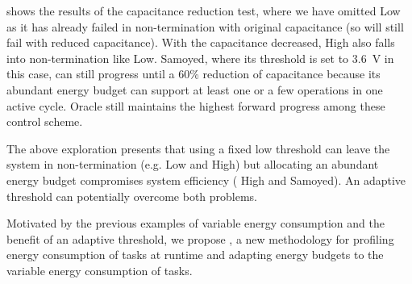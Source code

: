

 shows the results of the capacitance reduction test, where we have omitted \debs{} Low as it has already failed in non-termination with original capacitance (so will still fail with reduced capacitance). 
With the capacitance decreased, \debs{} High also falls into non-termination like \debs{} Low. 
Samoyed, where its threshold is set to \SI{3.6}{\volt} in this case, can still progress until a 60\% reduction of capacitance because its abundant energy budget can support at least one or a few operations in one active cycle.
\nn{} Oracle still maintains the highest forward progress among these control scheme. 


The above exploration presents that using a fixed low threshold can leave the system in non-termination (e.g. \debs{} Low and \debs{} High) but allocating an abundant energy budget compromises system efficiency (\debs{} High and Samoyed). 
An adaptive threshold can potentially overcome both problems.

Motivated by the previous examples of variable energy consumption and the benefit of an adaptive threshold, we propose \nn{}, a new methodology for profiling energy consumption of tasks at runtime and adapting energy budgets to the variable energy consumption of tasks. 
